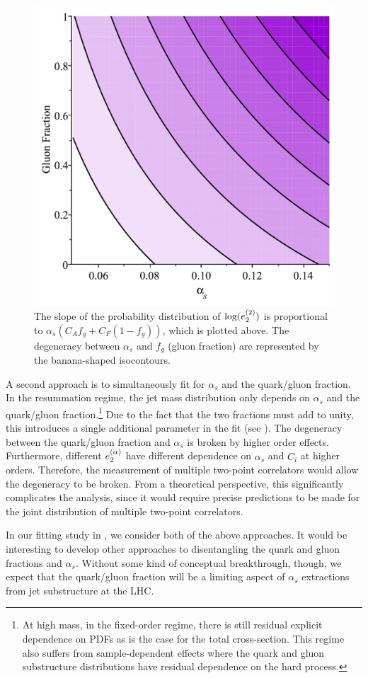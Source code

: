 \begin{figure}[t]
\begin{center}
\includegraphics[width = 0.4\columnwidth]{figures/Degeneracy}
\end{center}
\caption{The slope of the probability distribution of $\log(e_{2}^{(2)})$ is proportional to $\alpha_s(C_Af_g+C_F(1-f_g))$, which is plotted above.  The degeneracy between $\alpha_s$ and $f_g$ (gluon fraction) are represented by the banana-shaped isocontours. }
\label{fig:analyticbanana}
\end{figure}

A second approach is to simultaneously fit for $\alpha_s$ and the quark/gluon fraction.
%
In the resummation regime, the jet mass distribution only depends on $\alpha_s$ and the quark/gluon fraction.\footnote{At high mass, in the fixed-order regime, there is still residual explicit dependence on PDFs as is the case for the total cross-section.  This regime also suffers from sample-dependent effects where the quark and gluon substructure distributions have residual dependence on the hard process.}
%
Due to the fact that the two fractions must add to unity, this introduces a single additional parameter in the fit (see ).
%
The degeneracy between the quark/gluon fraction and $\alpha_s$ is broken by higher order effects.
%
Furthermore, different $e_{2}^{(\alpha)}$ have different dependence on $\alpha_s$ and $C_i$ at higher orders.
%
Therefore, the measurement of multiple two-point correlators would allow the degeneracy to be broken.
%
From a theoretical perspective, this significantly complicates the analysis, since it would require precise
predictions to be made for the joint distribution of multiple two-point correlators.


In our fitting study in , we consider both of the above approaches.
%
It would be interesting to develop other approaches to disentangling the quark and gluon fractions and $\alpha_s$.
%
Without some kind of conceptual breakthrough, though, we expect that the quark/gluon fraction will be a limiting aspect of $\alpha_s$ extractions from jet substructure at the LHC.


